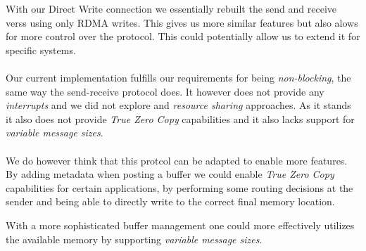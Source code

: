 With our Direct Write connection we essentially rebuilt the send and receive verss using only RDMA writes. This gives us more
similar features but also alows for more control over the protocol. This could potentially allow us to extend it for 
specific systems.

\paragraph{} Our current implementation fulfills our requirements for being \emph{non-blocking}, the same way the send-receive
protocol does. It however does not provide any \emph{interrupts} and we did not explore and \emph{resource sharing} approaches.
As it stands it also does not provide \emph{True Zero Copy} capabilities and it also lacks support for 
\emph{variable message sizes}.


\paragraph{} We do however think that this protcol can be adapted to enable more features. By adding metadata when posting a
buffer we could enable \emph{True Zero Copy} capabilities for certain applications, by performing some routing decisions at
the sender and being able to directly write to the correct final memory location.

With a more sophisticated buffer management one could more effectively utilizes the available memory by supporting 
\emph{variable message sizes}.



